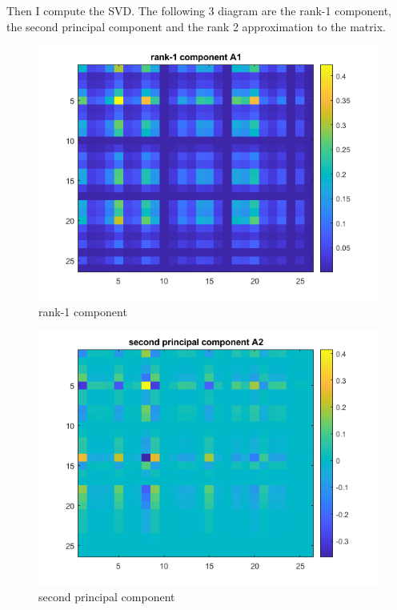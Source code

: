 \documentclass[a4paper]{article}
\begin{document}
Then I compute the SVD. The following 3 diagram are the rank-1 component, the second principal component and the rank 2 approximation to the matrix.

\begin{figure}[H] 
\centering 
\includegraphics[width=1.0\textwidth]{2.1-2.png}
\caption{rank-1 component} 
\label{Fig.2.1-2} 
\end{figure}

\begin{figure}[H] 
\centering 
\includegraphics[width=1.0\textwidth]{2.1-3.png}
\caption{second principal component} 
\label{Fig.2.1-3} 
\end{figure}
\end{document}
